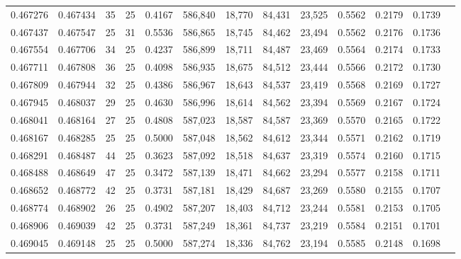\begin{tabular}{rrrrrrrrrrrrr}
0.467276 & 0.467434 &    35 &  25 &                                     0.4167 & 586,840 &  18,770 &  84,431 &  23,525 & 0.5562 & 0.2179 & 0.1739 \\
0.467437 & 0.467547 &    25 &  31 &                                     0.5536 & 586,865 &  18,745 &  84,462 &  23,494 & 0.5562 & 0.2176 & 0.1736 \\
0.467554 & 0.467706 &    34 &  25 &                                     0.4237 & 586,899 &  18,711 &  84,487 &  23,469 & 0.5564 & 0.2174 & 0.1733 \\
0.467711 & 0.467808 &    36 &  25 &                                     0.4098 & 586,935 &  18,675 &  84,512 &  23,444 & 0.5566 & 0.2172 & 0.1730 \\
0.467809 & 0.467944 &    32 &  25 &                                     0.4386 & 586,967 &  18,643 &  84,537 &  23,419 & 0.5568 & 0.2169 & 0.1727 \\
0.467945 & 0.468037 &    29 &  25 &                                     0.4630 & 586,996 &  18,614 &  84,562 &  23,394 & 0.5569 & 0.2167 & 0.1724 \\
0.468041 & 0.468164 &    27 &  25 &                                     0.4808 & 587,023 &  18,587 &  84,587 &  23,369 & 0.5570 & 0.2165 & 0.1722 \\
0.468167 & 0.468285 &    25 &  25 &                                     0.5000 & 587,048 &  18,562 &  84,612 &  23,344 & 0.5571 & 0.2162 & 0.1719 \\
0.468291 & 0.468487 &    44 &  25 &                                     0.3623 & 587,092 &  18,518 &  84,637 &  23,319 & 0.5574 & 0.2160 & 0.1715 \\
0.468488 & 0.468649 &    47 &  25 &                                     0.3472 & 587,139 &  18,471 &  84,662 &  23,294 & 0.5577 & 0.2158 & 0.1711 \\
0.468652 & 0.468772 &    42 &  25 &                                     0.3731 & 587,181 &  18,429 &  84,687 &  23,269 & 0.5580 & 0.2155 & 0.1707 \\
0.468774 & 0.468902 &    26 &  25 &                                     0.4902 & 587,207 &  18,403 &  84,712 &  23,244 & 0.5581 & 0.2153 & 0.1705 \\
0.468906 & 0.469039 &    42 &  25 &                                     0.3731 & 587,249 &  18,361 &  84,737 &  23,219 & 0.5584 & 0.2151 & 0.1701 \\
0.469045 & 0.469148 &    25 &  25 &                                     0.5000 & 587,274 &  18,336 &  84,762 &  23,194 & 0.5585 & 0.2148 & 0.1698 \\

\end{tabular}
